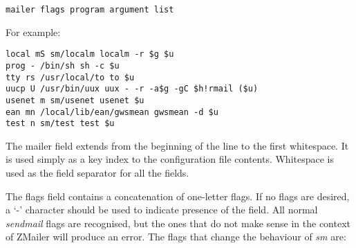 \begin{tscreen}
\begin{verbatim}
mailer flags program argument list
\end{verbatim}
\end{tscreen}


For example:

\begin{tscreen}
\begin{verbatim}
local mS sm/localm localm -r $g $u
prog - /bin/sh sh -c $u
tty rs /usr/local/to to $u
uucp U /usr/bin/uux uux - -r -a$g -gC $h!rmail ($u)
usenet m sm/usenet usenet $u
ean mn /local/lib/ean/gwsmean gwsmean -d $u
test n sm/test test $u
\end{verbatim}
\end{tscreen}


The mailer field extends from the beginning of the line to
the first whitespace. It is used simply as a key index to
the configuration file contents. Whitespace is used as
the field separator for all the fields.

The flags field contains a concatenation of one-letter
flags. If no flags are desired, a `-' character should be
used to indicate presence of the field. All normal {\em sendmail\/} flags 
are recognised, but the ones that do not make
sense in the context of ZMailer will produce an error.
The flags that change the behaviour of {\em sm\/} are:

